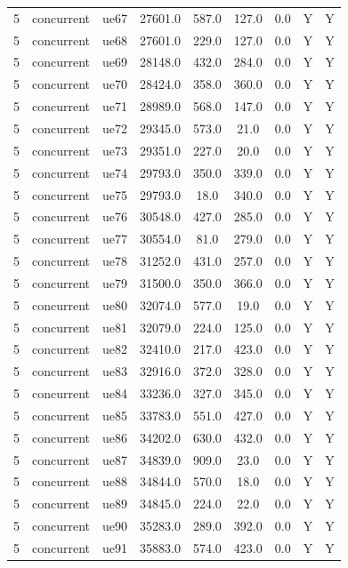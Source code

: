 \begin{table}[ht]
\begin{tabular}{|c|c|c|c|c|c|c|c|c|}
5 & concurrent & ue67 & 27601.0 & 587.0 & 127.0 & 0.0 & Y & Y \\
5 & concurrent & ue68 & 27601.0 & 229.0 & 127.0 & 0.0 & Y & Y \\
5 & concurrent & ue69 & 28148.0 & 432.0 & 284.0 & 0.0 & Y & Y \\
5 & concurrent & ue70 & 28424.0 & 358.0 & 360.0 & 0.0 & Y & Y \\
5 & concurrent & ue71 & 28989.0 & 568.0 & 147.0 & 0.0 & Y & Y \\
5 & concurrent & ue72 & 29345.0 & 573.0 & 21.0 & 0.0 & Y & Y \\
5 & concurrent & ue73 & 29351.0 & 227.0 & 20.0 & 0.0 & Y & Y \\
5 & concurrent & ue74 & 29793.0 & 350.0 & 339.0 & 0.0 & Y & Y \\
5 & concurrent & ue75 & 29793.0 & 18.0 & 340.0 & 0.0 & Y & Y \\
5 & concurrent & ue76 & 30548.0 & 427.0 & 285.0 & 0.0 & Y & Y \\
5 & concurrent & ue77 & 30554.0 & 81.0 & 279.0 & 0.0 & Y & Y \\
5 & concurrent & ue78 & 31252.0 & 431.0 & 257.0 & 0.0 & Y & Y \\
5 & concurrent & ue79 & 31500.0 & 350.0 & 366.0 & 0.0 & Y & Y \\
5 & concurrent & ue80 & 32074.0 & 577.0 & 19.0 & 0.0 & Y & Y \\
5 & concurrent & ue81 & 32079.0 & 224.0 & 125.0 & 0.0 & Y & Y \\
5 & concurrent & ue82 & 32410.0 & 217.0 & 423.0 & 0.0 & Y & Y \\
5 & concurrent & ue83 & 32916.0 & 372.0 & 328.0 & 0.0 & Y & Y \\
5 & concurrent & ue84 & 33236.0 & 327.0 & 345.0 & 0.0 & Y & Y \\
5 & concurrent & ue85 & 33783.0 & 551.0 & 427.0 & 0.0 & Y & Y \\
5 & concurrent & ue86 & 34202.0 & 630.0 & 432.0 & 0.0 & Y & Y \\
5 & concurrent & ue87 & 34839.0 & 909.0 & 23.0 & 0.0 & Y & Y \\
5 & concurrent & ue88 & 34844.0 & 570.0 & 18.0 & 0.0 & Y & Y \\
5 & concurrent & ue89 & 34845.0 & 224.0 & 22.0 & 0.0 & Y & Y \\
5 & concurrent & ue90 & 35283.0 & 289.0 & 392.0 & 0.0 & Y & Y \\
5 & concurrent & ue91 & 35883.0 & 574.0 & 423.0 & 0.0 & Y & Y \\

\end{tabular}
\end{table}
